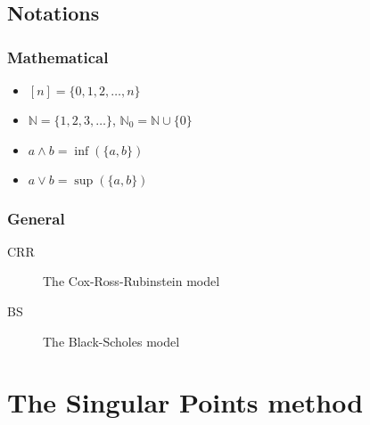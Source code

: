 \documentclass[12pt,a4paper]{amsbook}
\begin{document}
\frontmatter









\tableofcontents
\clearpage


\section*{Notations}

\subsection*{Mathematical}
\begin{itemize}
\item $ [n] = \{0, 1, 2, \dots, n\} $
\item $ \mathbb{N} = \{ 1, 2, 3, \dots \} $, $\mathbb{N}_0 = \mathbb{N} \cup \{ 0 \} $
\item $ a \wedge b = \inf(\{ a, b \}) $
\item $ a \vee b = \sup(\{ a, b \}) $
\end{itemize}

\subsection*{General}
\begin{description}
\item[CRR] The Cox-Ross-Rubinstein model
\item[BS] The Black-Scholes model
\end{description}



\mainmatter

% 


% 


\chapter{The Singular Points method}
\label{cha:sp}



\appendix


\backmatter

% 
\printbibliography
\end{document}
